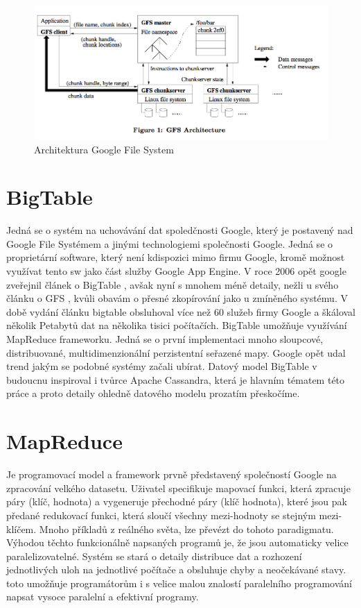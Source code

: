 \begin{figure}[h]
\centering
\includegraphics[scale=0.5]{images/gfs}
\caption{Architektura Google File System \cite{gfs}}
\label{fig:3v}
\end{figure}

\section{BigTable}
Jedná se o systém na uchovávání dat spoledčnosti Google, který je postavený nad Google File Systémem a jinými technologiemi společnosti Google. Jedná se o proprietární software, který není kdispozici mimo firmu Google, kromě možnost využívat tento sw jako část služby Google App Engine.  V roce 2006 opět google zveřejnil článek o BigTable \cite{bigtable}, avšak nyní s mnohem méně detaily, nežli u svého článku o GFS \cite{gfs}, kvůli obavám o přesné zkopírování jako u zmíněného systému. V době vydání článku bigtable obsluhoval více než 60 služeb firmy Google a škáloval několik Petabytů dat na několika tisici počítačích. BigTable umožňuje využívání MapReduce frameworku. Jedná se o první implementaci mnoho sloupcové, distribuované, multidimenzionální perzistentní seřazené mapy.  Google opět udal trend jakým se podobné systémy začali ubírat. Datový model BigTable v budoucnu inspiroval i tvůrce Apache Cassandra, která je hlavním tématem této práce a proto detaily ohledně datového modelu prozatím přeskočíme.

\section{MapReduce}
Je programovací model a framework prvně představený společností Google \cite{mapreduce} na zpracování velkého datasetu. Uživatel specifikuje mapovací funkci, která zpracuje páry (klíč, hodnota) a vygeneruje přechodné páry (klíč hodnota), které jsou pak předané redukovací funkci, která sloučí všechny mezi-hodnoty se stejným mezi-klíčem. Mnoho příkladů z reálného světa, lze převézt do tohoto paradigmatu. Výhodou těchto funkcionálně napsaných programů je, že jsou automaticky velice paralelizovatelné. Systém se stará o detaily distribuce dat a rozhození jednotlivých uloh na jednotlivé počítače a obsluhuje chyby a neočekávané stavy. toto umožňuje programátorům i s velice malou znalostí paralelního programování napsat vysoce paralelní a efektivní programy. 

